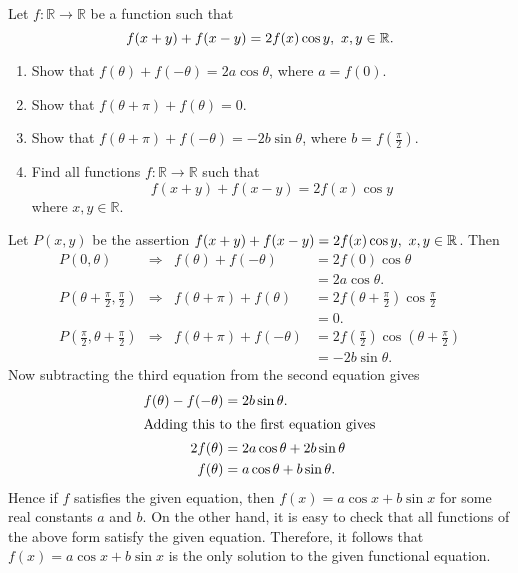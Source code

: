 \begin{question}
    Let $f:\mathbb{R} \rightarrow \mathbb{R}$ be a function such that 
    \[f(x + y) + f(x - y) = 2f(x)\cos y,\text{\space} x, y \in \mathbb{R}.\]
    \begin{enumerate}
        \item Show that $f(\theta) + f(-\theta) = 2a\cos \theta$, where $a =
            f(0)$. 
        
        \item Show that $f(\theta + \pi) + f(\theta) = 0$.
        
        \item Show that $f(\theta + \pi) + f(-\theta) = -2b\sin\theta$, where
            $b = f\left(\frac{\pi}{2}\right)$.
        
        \item Find all functions $f:\mathbb{R} \rightarrow \mathbb{R}$ such
            that $$f(x + y) + f(x - y) = 2f(x)\cos y$$ where $x,y \in
            \mathbb{R}$.
    \end{enumerate}
\end{question}
\begin{solution}
    Let $P(x, y)$ be the assertion $f(x + y) + f(x - y) = 2f(x)\cos
    y,\text{\space} x, y \in \mathbb{R}$. Then
    \begin{align*}
        P(0, \theta) &\Longrightarrow & f(\theta) + f(-\theta) &= 2f(0)\cos \theta\\
        & & &= 2a\cos \theta.\\
        P \left( \theta + \frac{\pi}{2}, \frac{\pi}{2} \right) &\Longrightarrow & f(\theta + \pi) + f(\theta) &= 2f \left( \theta + \frac{\pi}{2} \right) \cos \frac{\pi}{2}\\
        & & &= 0.\\
        P \left(\frac{\pi}{2}, \theta + \frac{\pi}{2} \right) & \Longrightarrow & f(\theta + \pi) + f(-\theta) &= 2f \left( \frac{\pi}{2} \right) \cos \left( \theta + \frac{\pi}{2} \right)\\
        & & &= -2b \sin \theta.
    \end{align*}
    Now subtracting the third equation from the second equation gives
    \begin{align*}
        f(\theta) - f(-\theta) &= 2b \sin \theta. \\
    \intertext{Adding this to the first equation gives}
        2f(\theta) &= 2a \cos \theta + 2b \sin \theta\\
        f(\theta) &= a \cos \theta + b \sin \theta. 
    \end{align*}
    Hence if $f$ satisfies the given equation, then $f(x) = a \cos x + b \sin
    x$ for some real constants $a$ and $b$. On the other hand, it is easy to
    check that all functions of the above form satisfy the given equation.
    Therefore, it follows that $f(x) = a \cos x + b \sin x$ is the only
    solution to the given functional equation.
\end{solution}

